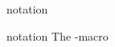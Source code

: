 \documentclass{stex}
\begin{document}
  \begin{smodule}[title=The \texttt{notation}-Macro]{notation}
  
  \begin{sfunction}{notation}{\notation}
    The \dcs-macro
  \end{sfunction}
   
  \end{smodule}
\end{document}
